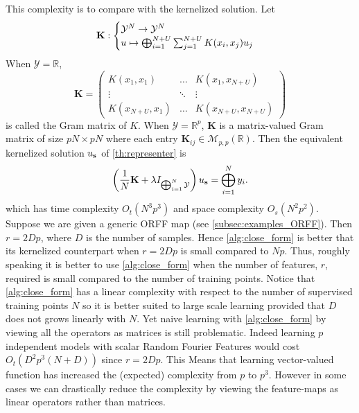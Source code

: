 \documentclass[twoside,11pt]{article}
\begin{document}
This complexity is to compare with the kernelized solution. Let
\begin{dmath*}
    \mathbf{K}:
    \begin{cases}
        \mathcal{Y}^{N} \to \mathcal{Y}^{N} \\
        u\mapsto\Vect_{i=1}^{N+U}\sum_{j=1}^{N+U}K(x_i, x_j)u_j
    \end{cases}
\end{dmath*}
When $\mathcal{Y}=\mathbb{R}$,
\begin{dmath*}
    \mathbf{K}=
    \begin{pmatrix} K(x_1, x_1) & \hdots & K(x_1, x_{N+U}) \\ \vdots
        & \ddots & \vdots \\  K(x_{N+U}, x_1) & \hdots & K(x_{N+U}, x_{N+U})
    \end{pmatrix}
\end{dmath*}
is called the Gram matrix of $K$. When $\mathcal{Y}=\mathbb{R}^p$, $\mathbf{K}$
is a matrix-valued Gram matrix of size $pN\times pN$ where each entry
$\mathbf{K}_{ij}\in\mathcal{M}_{p,p}(\mathbb{R})$. Then the equivalent
kernelized solution $u_{\boldsymbol{\mathbf{s}}}$ of \cref{th:representer} is
\begin{dmath*}
    \left(\frac{1}{N} \mathbf{K}  + \lambda
    I_{\Vect_{i=1}^{N}\mathcal{Y}}\right)u_{\seq{s}}=\Vect_{i=1}^N y_i.
\end{dmath*}
which has time complexity $O_t\left(N^3p^3\right)$ and space complexity
$O_s\left(N^2p^2\right)$. Suppose we are given a generic \acs{ORFF} map (see
\cref{subsec:examples_ORFF}). Then $r=2Dp$, where $D$ is the number of samples.
Hence \cref{alg:close_form} is better that its kernelized counterpart when
$r=2Dp$ is small compared to $Np$. Thus, roughly speaking it is better to use
\cref{alg:close_form} when the number of features, $r$, required is small
compared to the number of training points. Notice that \cref{alg:close_form}
has a linear complexity with respect to the number of supervised training
points $N$ so it is better suited to large scale learning provided that $D$
does not grows linearly with $N$.  Yet naive learning with
\cref{alg:close_form} by viewing all the operators as matrices is still
problematic. Indeed learning $p$ independent models with scalar Random Fourier
Features would cost $O_t\left(D^2p^3(N + D)\right)$ since $r=2Dp$. This Means
that learning vector-valued function has increased the (expected) complexity
from $p$ to $p^3$. However in some cases we can drastically reduce the
complexity by viewing the feature-maps as linear operators rather than
matrices.
\end{document}
